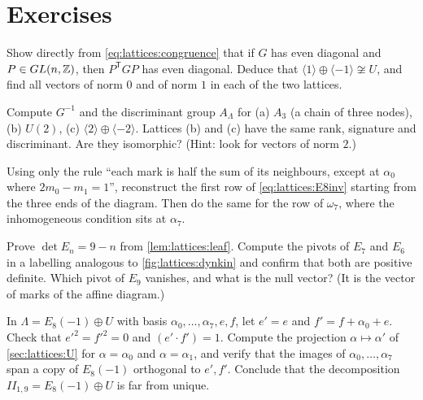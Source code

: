 \section*{Exercises}

\begin{exercise}\label{ex:lattices:parity}
Show directly from \eqref{eq:lattices:congruence} that if $G$ has even diagonal and
$P\in GL(n,\mathbb{Z})$, then $P^{\mathsf T}GP$ has even diagonal. Deduce that
$\langle1\rangle\oplus\langle-1\rangle\not\cong U$, and find all vectors of norm $0$ and of
norm $1$ in each of the two lattices.
\end{exercise}

\begin{exercise}\label{ex:lattices:discgroups}
Compute $G^{-1}$ and the discriminant group $A_\Lambda$ for (a) $A_3$ (a chain of three
nodes), (b) $U(2)$, (c) $\langle2\rangle\oplus\langle-2\rangle$. Lattices (b) and (c) have
the same rank, signature and discriminant. Are they isomorphic? (Hint: look for vectors of
norm $2$.)
\end{exercise}

\begin{exercise}\label{ex:lattices:marks}
Using only the rule ``each mark is half the sum of its neighbours, except at $\alpha_0$
where $2m_0-m_1=1$'', reconstruct the first row of \eqref{eq:lattices:E8inv} starting from
the three ends of the diagram. Then do the same for the row of $\omega_7$, where the
inhomogeneous condition sits at $\alpha_7$.
\end{exercise}

\begin{exercise}\label{ex:lattices:En}
Prove $\det E_n=9-n$ from \cref{lem:lattices:leaf}. Compute the pivots of $E_7$ and $E_6$ in
a labelling analogous to \cref{fig:lattices:dynkin} and confirm that both are positive
definite. Which pivot of $E_9$ vanishes, and what is the null vector? (It is the vector of
marks of the affine diagram.)
\end{exercise}

\begin{exercise}\label{ex:lattices:split}
In $\Lambda=E_8(-1)\oplus U$ with basis $\alpha_0,\dots,\alpha_7,e,f$, let
$e'=e$ and $f'=f+\alpha_0+e$. Check that $e'^2=f'^2=0$ and $(e'\cdot f')=1$. Compute the
projection $\alpha\mapsto\alpha'$ of \cref{sec:lattices:U} for $\alpha=\alpha_0$ and
$\alpha=\alpha_1$, and verify that the images of $\alpha_0,\dots,\alpha_7$ span a copy of
$E_8(-1)$ orthogonal to $e',f'$. Conclude that the decomposition
$II_{1,9}=E_8(-1)\oplus U$ is far from unique.
\end{exercise}

